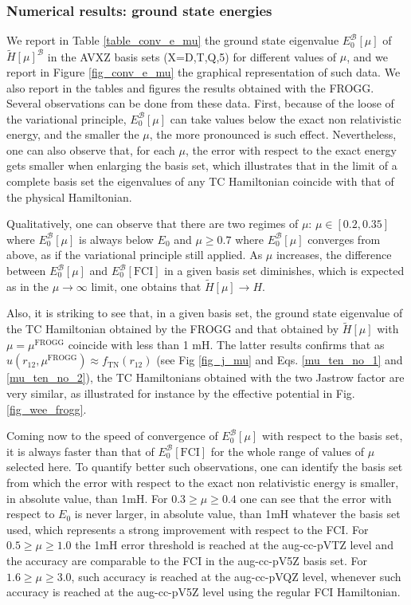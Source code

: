 \documentclass[aip,jcp,reprint,noshowkeys,superscriptaddress]{revtex4-1}
\newcommand{\mfrogg}[0]{\mu^\text{FROGG}}
\newcommand{\basis}[0]{\mathcal{B}}
\begin{document}
\subsubsection{Numerical results: ground state energies}
\label{sec:total_e}
We report in Table \ref{table_conv_e_mu} the ground state eigenvalue $E_0^{\basis}[\mu]$ of $\tilde{H}[\mu]^{\basis}$ in the AVXZ basis sets (X=D,T,Q,5) for different values of $\mu$, and we report in Figure \ref{fig_conv_e_mu} the graphical representation of such data. We also report in the tables and figures the results obtained with the FROGG. 
Several observations can be done from these data. First, because of the loose of the variational principle, $E_0^{\basis}[\mu]$ can take values below the exact non relativistic energy, and the smaller the $\mu$, the more pronounced is such effect. 
Nevertheless, one can also observe that, for each $\mu$, the error with respect to the exact energy gets smaller  
when enlarging the basis set, which illustrates that in the limit of a complete basis set the eigenvalues of any TC Hamiltonian coincide with that of the physical Hamiltonian. 

Qualitatively, one can observe that there are two regimes of $\mu$: $\mu \in[0.2,0.35]$ where $E_0^{\basis}[\mu]$ is always below $E_0$ and $\mu\ge 0.7$ where $E_0^{\basis}[\mu]$ converges from above, as if the variational principle still applied. 
As $\mu$ increases, the difference between $E_0^{\basis}[\mu]$ and $E_0^{\basis}[\text{FCI}]$ in a given basis set diminishes, 
which is expected as in the $\mu \rightarrow \infty$ limit, one obtains that  $\tilde{H}[\mu] \rightarrow H$. 

Also, it is striking to see that, in a given basis set, the ground state eigenvalue of the TC Hamiltonian obtained by the FROGG and that obtained by $\tilde{H}[\mu]$ with $\mu=\mfrogg$ coincide with less than 1 mH. 
The latter results confirms that as $u(r_{12},\mfrogg) \approx f_{\text{TN}}(r_{12})$ (see Fig \ref{fig_j_mu} and Eqs. \eqref{mu_ten_no_1} and \eqref{mu_ten_no_2}), the TC Hamiltonians obtained with the two Jastrow factor are very similar, as illustrated for instance by the effective potential in Fig. \ref{fig_wee_frogg}. 

Coming now to the speed of convergence of $E_0^{\basis}[\mu]$ with respect to the basis set, it is always faster than that of $E_0^{\basis}[\text{FCI}]$ for the whole range of values of $\mu$ selected here. 
To quantify better such observations, one can identify the basis set from which the error with respect to the exact non relativistic energy is smaller, in absolute value, than 1mH. 
For $0.3\ge\mu\ge0.4$ one can see that the error with respect to $E_0$ is never larger, in absolute value, than 1mH whatever the basis set used, which represents a strong improvement with respect to the FCI. For $0.5\ge \mu \ge 1.0$ the 1mH error threshold is reached at the aug-cc-pVTZ level and the accuracy are comparable to the FCI in the aug-cc-pV5Z basis set. For $1.6\ge \mu \ge 3.0$, such accuracy is reached at the aug-cc-pVQZ level, whenever such accuracy is reached at the aug-cc-pV5Z level using the regular FCI Hamiltonian. 
\end{document}
